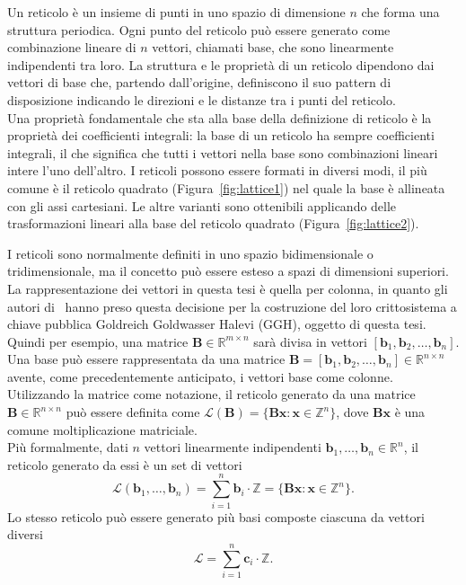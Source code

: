 Un reticolo è un insieme di punti in uno spazio di dimensione $n$ che forma una struttura 
periodica. Ogni punto del reticolo può essere generato come combinazione lineare di 
$n$ vettori, chiamati base, che sono linearmente indipendenti tra loro.
La struttura e le proprietà di un reticolo dipendono dai vettori di base che, 
partendo dall'origine, definiscono il suo pattern di disposizione indicando le direzioni 
e le distanze tra i punti del reticolo. \\
Una proprietà fondamentale che sta alla base della definizione di reticolo è la proprietà dei 
coefficienti integrali: la base di un reticolo ha sempre coefficienti integrali, 
il che significa che tutti i vettori nella base sono combinazioni lineari intere 
l'uno dell'altro.
I reticoli possono essere formati in diversi modi, il più comune è il reticolo quadrato 
(Figura~\ref{fig:lattice1}) nel quale la base è allineata con gli assi cartesiani. 
Le altre varianti sono ottenibili applicando delle trasformazioni lineari alla base del 
reticolo quadrato (Figura~\ref{fig:lattice2}).


I reticoli sono normalmente definiti in uno spazio bidimensionale o tridimensionale, 
ma il concetto può essere esteso a spazi di dimensioni superiori. La rappresentazione dei vettori in questa tesi è quella per colonna, 
in quanto gli autori di~\cite{GGH97} hanno preso questa decisione per la costruzione
del loro crittosistema a chiave pubblica Goldreich Goldwasser Halevi (GGH), oggetto di questa tesi. Quindi per esempio, una matrice 
$\mathbf{B} \in \mathbb{R}^{m\times n}$ sarà divisa in vettori 
$[\mathbf{b}_1, \mathbf{b}_2, \dots, \mathbf{b}_n]$. 
\\
Una base può essere rappresentata da una matrice  
$\mathbf{B} = [\mathbf{b}_1,\mathbf{b}_2,\dots,\mathbf{b}_n] \in \mathbb{R}^{n \times n}$ 
avente, come precedentemente anticipato, i vettori base come colonne.  Utilizzando la matrice come notazione, 
il reticolo generato da una matrice 
$\mathbf{B} \in \mathbb{R}^{n \times n}$ 
può essere definita come 
${\mathcal{L}(\mathbf{B}) = \bigl\{ \mathbf{B} \mathbf{x} : \mathbf{x} \in \mathbb{Z}^n \bigr\}}$, 
dove $\mathbf{B} \mathbf{x}$ 
è una comune moltiplicazione matriciale. \\
Più formalmente, dati $n$ vettori linearmente indipendenti 
$\mathbf{b}_1,\dots, \mathbf{b}_n \in \mathbb{R}^n$,
il reticolo generato da essi è un set di vettori 
\[
\mathcal{L} (\mathbf{b}_1,\dots,\mathbf{b}_n) = \sum_{i=1}^{n}\mathbf{b}_i \cdot 
\mathbb{Z} = \bigl\{ {\mathbf{B} \mathbf{x} : \mathbf{x} \in \mathbb{Z}^n} \bigr\}.
\]
Lo stesso reticolo può essere generato più basi composte ciascuna da vettori diversi
\[
    \mathcal{L} = \sum_{i=1}^{n}\mathbf{c}_i \cdot \mathbb{Z} .
\]

